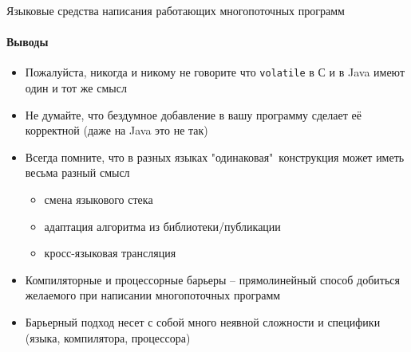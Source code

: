 \begin{frame}[fragile]{Языковые средства написания работающих многопоточных программ}
\framesubtitle{Выводы}

\begin{itemize}

 \pause
 \item Пожалуйста, никогда и никому не говорите что \texttt{volatile} в С и в Java имеют один и тот же смысл
 
 \pause
 \item Не думайте, что бездумное добавление  в вашу программу сделает её корректной (даже на Java это не так)
 
 \pause
 \item Всегда помните, что в разных языках "одинаковая"\ конструкция может иметь весьма разный смысл
 \begin{itemize}
    \item смена языкового стека
    \item адаптация алгоритма из библиотеки/публикации
    \item кросс-языковая трансляция
 \end{itemize}

 \pause
 \item Компиляторные и процессорные барьеры -- прямолинейный способ добиться желаемого при написании многопоточных программ

 \pause
 \item Барьерный подход несет с собой много неявной сложности и специфики (языка, компилятора, процессора)
\end{itemize}

\end{frame}


